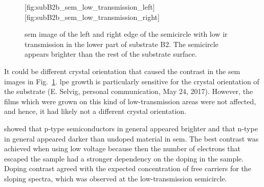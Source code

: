 \begin{figure}[htbp]
    \centering
    [fig:subB2b_sem_low_transmission_left]
    \hfill
    [fig:subB2b_sem_low_transmission_right]
    \caption[\Ac{sem} image of the semicircle with low \ac{ir} transmission on substrate B2.]{\Ac{sem} image of the  left and  right edge of the semicircle with low \ac{ir} transmission in the lower part of substrate B2. The semicircle appears brighter than the rest of the substrate surface.}\label{fig:subB2b_sem_low_transmission}
\end{figure}

It could be different crystal orientation that caused the contrast in the \ac{sem} images in Fig.~\ref{fig:subB2b_sem_low_transmission}. \Ac{lpe} growth is particularly sensitive for the crystal orientation of the substrate (E. Selvig, personal communication, May 24, 2017). However, the films which were grown on this kind of low-transmission areas were not affected, and hence, it had likely not a different crystal orientation. 

\citet{sealy2000mechanism} showed that p-type semiconductors in general appeared brighter and that n-type in general appeared darker than undoped material in \ac{sem}. The best contrast was achieved when using low voltage because then the number of electrons that escaped the sample had a stronger dependency on the doping in the sample. Doping contrast agreed with the expected concentration of free carriers for the sloping spectra, which was observed at the low-transmission semicircle.

